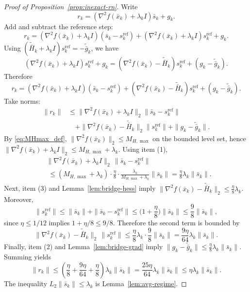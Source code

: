 \documentclass[review,onefignum,onetabnum]{siamart171218}
\begin{document}
	\begin{proof}[Proof of Proposition~\ref{prop:inexact-rn}]
		Write
		\[
		r_k=(\nabla^2 f(\bar x_k)+\lambda_k I)\bar s_k+g_k.
		\]
		Add and subtract the reference step:
		\[
		r_k=(\nabla^2 f(\bar x_k)+\lambda_k I)(\bar s_k-s_k^{\mathrm{ref}})
		+(\nabla^2 f(\bar x_k)+\lambda_k I)s_k^{\mathrm{ref}}+g_k.
		\]
		Using $(\tilde{\bar H}_k+\lambda_k I)s_k^{\mathrm{ref}}=-\tilde{\bar g}_k$, we have
		\[
		(\nabla^2 f(\bar x_k)+\lambda_k I)s_k^{\mathrm{ref}}+g_k
		=(\nabla^2 f(\bar x_k)-\tilde{\bar H}_k)s_k^{\mathrm{ref}}+(g_k-\tilde{\bar g}_k).
		\]
		Therefore
		\[
		r_k=(\nabla^2 f(\bar x_k)+\lambda_k I)(\bar s_k-s_k^{\mathrm{ref}})
		+(\nabla^2 f(\bar x_k)-\tilde{\bar H}_k)s_k^{\mathrm{ref}}+(g_k-\tilde{\bar g}_k).
		\]
		Take norms:
		\begin{align*}
			\|r_k\|
			&\le \|\nabla^2 f(\bar x_k)\!+\!\lambda_k I\|_2\|\bar s_k\!-\!s_k^{\mathrm{ref}}\|\\
			&\quad+\|\nabla^2 f(\bar x_k)\!-\!\tilde{\bar H}_k\|_2\|s_k^{\mathrm{ref}}\|
			+\|g_k\!-\!\tilde{\bar g}_k\|.
		\end{align*}
		By \eqref{eq:MHmax_def}, $\|\nabla^2 f(\bar x_k)\|_2\le M_{H,\max}$ on the bounded level set, hence
		$\|\nabla^2 f(\bar x_k)+\lambda_k I\|_2\le M_{H,\max}+\lambda_k$.
		Using item (1),
		\begin{align*}
			&\|\nabla^2 f(\bar x_k)\!+\!\lambda_k I\|_2\,\|\bar s_k\!-\!s_k^{\mathrm{ref}}\|\\
			&\;\le (M_{H,\max}\!+\!\lambda_k)\!\cdot\!\tfrac{\eta}{8}\!\cdot\!\tfrac{\lambda_k}{M_{H,\max}+\lambda_k}\|\bar s_k\|
			=\tfrac{\eta}{8}\lambda_k\|\bar s_k\|.
		\end{align*}
		Next, item (3) and Lemma~\ref{lem:bridge-hess} imply
		$\|\nabla^2 f(\bar x_k)-\tilde{\bar H}_k\|_2\le \frac{\eta}{8}\lambda_k$.
		Moreover,
		\[
		\|s_k^{\mathrm{ref}}\|\le \|\bar s_k\|+\|\bar s_k-s_k^{\mathrm{ref}}\|
		\le \Big(1+\frac{\eta}{8}\Big)\|\bar s_k\|\le \frac98\|\bar s_k\|,
		\]
		since $\eta\le 1/12$ implies $1+\eta/8\le 9/8$.
		Therefore the second term is bounded by
		\[
		\|\nabla^2 f(\bar x_k)-\tilde{\bar H}_k\|_2\,\|s_k^{\mathrm{ref}}\|
		\le \frac{\eta}{8}\lambda_k\cdot \frac98\|\bar s_k\|=\frac{9\eta}{64}\lambda_k\|\bar s_k\|.
		\]
		Finally, item (2) and Lemma~\ref{lem:bridge-grad} imply $\|g_k-\tilde{\bar g}_k\|\le \frac{\eta}{8}\lambda_k\|\bar s_k\|$.
		Summing yields
		\[
		\|r_k\|\le \left(\frac{\eta}{8}+\frac{9\eta}{64}+\frac{\eta}{8}\right)\lambda_k\|\bar s_k\|
		=\frac{25\eta}{64}\lambda_k\|\bar s_k\|\le \eta\lambda_k\|\bar s_k\|.
		\]
		The inequality $L_2\|\bar s_k\|\le \lambda_k$ is Lemma~\ref{lem:avg-regime}.
	\end{proof}
	
\end{document}
